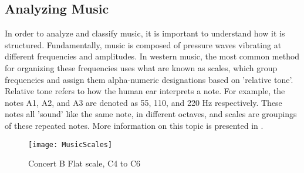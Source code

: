 \documentclass[conference]{IEEEtran}
\begin{document}
\subsection{Analyzing Music}\label{sec:AnalyzingMusic}
In order to analyze and classify music, it is important to understand how it is structured. Fundamentally, music is composed of pressure waves vibrating at different frequencies and amplitudes. In western music, the most common method for organizing these frequencies uses what are known as scales, which group frequencies and assign them alpha-numeric designations based on 'relative tone'. Relative tone refers to how the human ear interprets a note. For example, the notes A1, A2, and A3 are denoted as 55, 110, and 220 Hz respectively. These notes all 'sound' like the same note, in different octaves, and scales are groupings of these repeated notes. More information on this topic is presented in \cite{gothamOPENMUSICTHEORY2021}.
\begin{figure}[!htb]
  \texttt{[image: MusicScales]}
  \caption{Concert B Flat scale, C4 to C6}\label{fig:MusicScales}
\end{figure}
\end{document}

